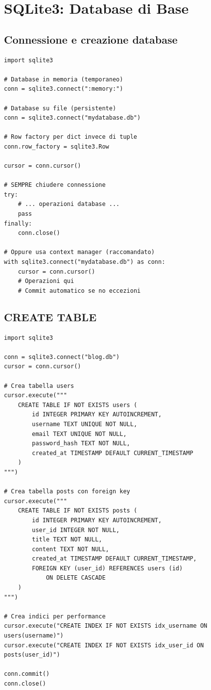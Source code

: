 \section{SQLite3: Database di Base}

\subsection{Connessione e creazione database}

\begin{lstlisting}
import sqlite3

# Database in memoria (temporaneo)
conn = sqlite3.connect(":memory:")

# Database su file (persistente)
conn = sqlite3.connect("mydatabase.db")

# Row factory per dict invece di tuple
conn.row_factory = sqlite3.Row

cursor = conn.cursor()

# SEMPRE chiudere connessione
try:
    # ... operazioni database ...
    pass
finally:
    conn.close()

# Oppure usa context manager (raccomandato)
with sqlite3.connect("mydatabase.db") as conn:
    cursor = conn.cursor()
    # Operazioni qui
    # Commit automatico se no eccezioni
\end{lstlisting}

\subsection{CREATE TABLE}

\begin{lstlisting}
import sqlite3

conn = sqlite3.connect("blog.db")
cursor = conn.cursor()

# Crea tabella users
cursor.execute("""
    CREATE TABLE IF NOT EXISTS users (
        id INTEGER PRIMARY KEY AUTOINCREMENT,
        username TEXT UNIQUE NOT NULL,
        email TEXT UNIQUE NOT NULL,
        password_hash TEXT NOT NULL,
        created_at TIMESTAMP DEFAULT CURRENT_TIMESTAMP
    )
""")

# Crea tabella posts con foreign key
cursor.execute("""
    CREATE TABLE IF NOT EXISTS posts (
        id INTEGER PRIMARY KEY AUTOINCREMENT,
        user_id INTEGER NOT NULL,
        title TEXT NOT NULL,
        content TEXT NOT NULL,
        created_at TIMESTAMP DEFAULT CURRENT_TIMESTAMP,
        FOREIGN KEY (user_id) REFERENCES users (id)
            ON DELETE CASCADE
    )
""")

# Crea indici per performance
cursor.execute("CREATE INDEX IF NOT EXISTS idx_username ON users(username)")
cursor.execute("CREATE INDEX IF NOT EXISTS idx_user_id ON posts(user_id)")

conn.commit()
conn.close()
\end{lstlisting}

